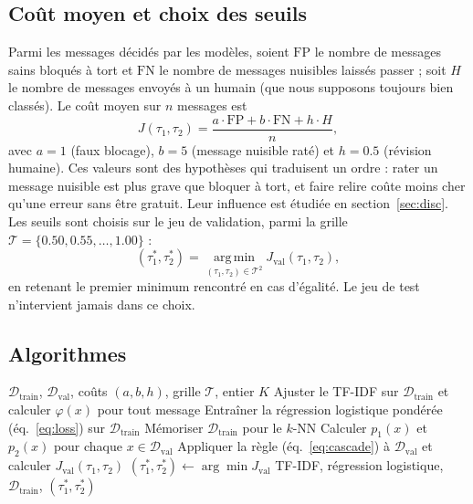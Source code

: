 \documentclass[a4paper,fleqn]{cas-sc}
\begin{document}
\subsection{Coût moyen et choix des seuils}
\label{sec:cout}

Parmi les messages décidés par les modèles, soient $\mathrm{FP}$ le nombre de messages sains bloqués à
tort et $\mathrm{FN}$ le nombre de messages nuisibles laissés passer ; soit $H$ le nombre de messages
envoyés à un humain (que nous supposons toujours bien classés). Le coût moyen sur $n$ messages est
\begin{equation}
J(\tau_1,\tau_2) = \frac{a\cdot\mathrm{FP} + b\cdot\mathrm{FN} + h\cdot H}{n},
\label{eq:cout}
\end{equation}
avec $a=1$ (faux blocage), $b=5$ (message nuisible raté) et $h=0.5$ (révision humaine). Ces valeurs sont
des hypothèses qui traduisent un ordre : rater un message nuisible est plus grave que bloquer à tort,
et faire relire coûte moins cher qu'une erreur sans être gratuit. Leur influence est étudiée en
section~\ref{sec:disc}. Les seuils sont choisis sur le jeu de validation, parmi la grille
$\mathcal{T}=\{0.50, 0.55, \dots, 1.00\}$ :
\begin{equation}
(\tau_1^{*},\tau_2^{*}) = \operatorname*{arg\,min}_{(\tau_1,\tau_2)\in\mathcal{T}^2} J_{\mathrm{val}}(\tau_1,\tau_2),
\label{eq:argmin}
\end{equation}
en retenant le premier minimum rencontré en cas d'égalité. Le jeu de test n'intervient jamais dans ce choix.

\subsection{Algorithmes}

\begin{algorithm}[t]
\caption{Apprentissage et choix des seuils}
\label{alg:train}
\begin{algorithmic}[1]
\Require $\mathcal{D}_{\mathrm{train}}$, $\mathcal{D}_{\mathrm{val}}$, coûts $(a,b,h)$, grille $\mathcal{T}$, entier $K$
\State Ajuster le TF-IDF sur $\mathcal{D}_{\mathrm{train}}$ et calculer $\varphi(x)$ pour tout message
\State Entraîner la régression logistique pondérée (éq.~\ref{eq:loss}) sur $\mathcal{D}_{\mathrm{train}}$
\State Mémoriser $\mathcal{D}_{\mathrm{train}}$ pour le $k$-NN
\State Calculer $p_1(x)$ et $p_2(x)$ pour chaque $x\in\mathcal{D}_{\mathrm{val}}$
    \State Appliquer la règle (éq.~\ref{eq:cascade}) à $\mathcal{D}_{\mathrm{val}}$ et calculer $J_{\mathrm{val}}(\tau_1,\tau_2)$
\EndFor
\State $(\tau_1^{*},\tau_2^{*}) \gets \arg\min J_{\mathrm{val}}$
\Ensure TF-IDF, régression logistique, $\mathcal{D}_{\mathrm{train}}$, $(\tau_1^{*},\tau_2^{*})$
\end{algorithmic}
\end{algorithm}
\end{document}
